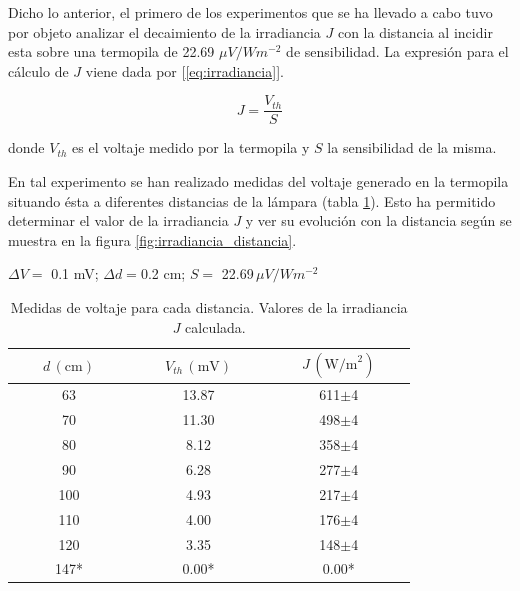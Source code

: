 Dicho lo anterior, el primero de los experimentos que se ha llevado a cabo tuvo por objeto analizar el decaimiento de la irradiancia $J$ con la distancia al incidir esta sobre una termopila de 22.69 $\mu V/Wm^{-2}$ de sensibilidad. La expresión para el cálculo de $J$ viene dada por [\ref{eq:irradiancia}].

\vspace{\baselineskip}

\begin{equation}\label{eq:irradiancia}
	J = \frac{V_{th}}{S}
\end{equation}

\vspace{\baselineskip}

donde $V_{th}$ es el voltaje medido por la termopila y $S$ la sensibilidad de la misma. 

\vspace{\baselineskip}

En tal experimento se han realizado medidas del voltaje generado en la termopila situando ésta a diferentes distancias de la lámpara (tabla \ref{tab:medidas_voltajes}). Esto ha permitido determinar el valor de la irradiancia $J$ y ver su evolución con la distancia según se muestra en la figura  \ref{fig:irradiancia_distancia}.

\vspace{\baselineskip}

\begin{table}[H]
	\centering
	$\Delta V=$ 0.1 mV; $\Delta d=$0.2 cm; $S =$ 22.69$\, \mu V/Wm^{-2}$ \\ 
	\begin{threeparttable}
		\begin{tabular}{c|c|c}
			\toprule
			\toprule
			$\qquad d\,(\text{cm})\qquad$ & $\qquad V_{th}\,(\text{mV})\qquad$ & $\qquad J\,(\text{W/m}^2)\qquad$    \\
			\midrule		
			63 & 13.87 & 611$\pm$4  \\
			70 & 11.30 & 498$\pm$4  \\
			80 &  8.12 & 358$\pm$4  \\
			90 &  6.28 & 277$\pm$4  \\
			100 & 4.93 & 217$\pm$4  \\
			110 & 4.00 & 176$\pm$4  \\
			120 & 3.35 & 148$\pm$4  \\
			147* & 0.00* & 0.00*   \\
			\bottomrule
			\bottomrule
		\end{tabular}
		\caption{Medidas de voltaje para cada distancia. Valores de la irradiancia $J$ calculada.}
		\label{tab:medidas_voltajes}
	\end{threeparttable}
\end{table}

